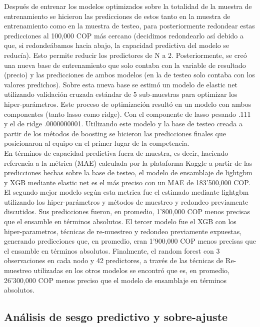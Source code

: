\documentclass[10pt]{article}
\begin{document}
Después de entrenar los modelos optimizados sobre la totalidad de la muestra de entrenamiento se hicieron las predicciones de estos tanto en la muestra de entrenamiento como en la muestra de testeo, para posteriormente redondear estas predicciones al 100,000 COP más cercano (decidimos redondearlo así debido a que, si redondeábamos hacia abajo, la capacidad predictiva del modelo se reducía). Esto permite reducir los predictores de N a 2. Posteriormente, se creó una nueva base de entrenamiento que solo contaba con la variable de resultado (precio) y las predicciones de ambos modelos (en la de testeo solo contaba con los valores predichos). Sobre esta nueva base se estimó un modelo de elastic net utilizando validación cruzada estándar de 5 sub-muestras para optimizar los hiper-parámetros. Este proceso de optimización resultó en un modelo con ambos componentes (tanto lasso como ridge). Con el componente de lasso pesando .111 y el de ridge .0000000001. Utilizando este modelo y la base de testeo creada a partir de los métodos de boosting se hicieron las predicciones finales que posicionaron al equipo en el primer lugar de la competencia. \\

En términos de capacidad predictiva fuera de muestra, es decir, haciendo referencia a la métrica (MAE) calculada por la plataforma Kaggle a partir de las predicciones hechas sobre la base de testeo, el modelo de ensamblaje de lightgbm y XGB mediante elastic net es el más preciso con un MAE de 183’500,000 COP. El segundo mejor modelo según esta metrica fue el estimado mediante lightgbm utilizando los hiper-parámetros y métodos de muestreo y redondeo previamente discutidos. Sus predicciones fueron, en promedio, 1’800,000 COP menos precisas que el ensamble en términos absolutos. El tercer modelo fue el XGB con los hiper-parametros, técnicas de re-muestreo y redondeo previamente expuestas, generando predicciones que, en promedio, eran 1’900,000 COP menos precisas que el ensamble en términos absolutos. Finalmente, el random forest con 3 observaciones en cada nodo y 42 predictores, a través de las técnicas de Re-muestreo utilizadas en los otros modelos se encontró que es, en promedio, 26’300,000 COP menos preciso que el modelo de ensamblaje en términos absolutos.

\subsection{Análisis de sesgo predictivo y sobre-ajuste}
\end{document}
